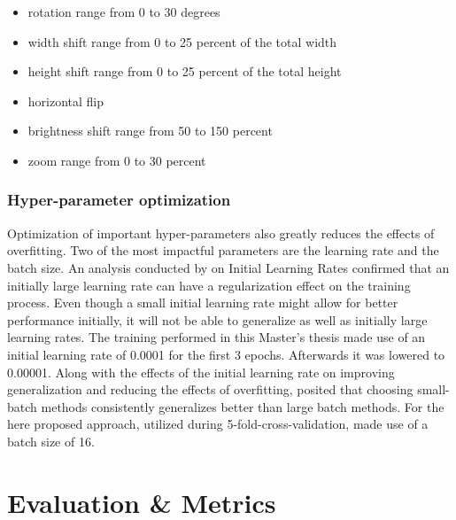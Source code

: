 \begin{itemize}
    \item rotation range from 0 to 30 degrees
    \item width shift range from 0 to 25 percent of the total width
    \item height shift range from 0 to 25 percent of the total height
    \item horizontal flip
    \item brightness shift range from 50 to 150 percent
    \item zoom range from 0 to 30 percent
\end{itemize}


\subsubsection{Hyper-parameter optimization}
Optimization of important hyper-parameters also greatly reduces the effects of overfitting. Two of the most impactful parameters are the learning rate and the batch size.
\newline\newline
An analysis conducted by \citet{Yuanzhi:2019:RegularizationInitialLargeLearningRate} on Initial Learning Rates confirmed that an initially large learning rate can have a regularization effect on the training process. Even though a small initial learning rate might allow for better performance initially, it will not be able to generalize as well as initially large learning rates. The training performed in this Master's thesis made use of an initial learning rate of 0.0001 for the first 3 epochs. Afterwards it was lowered to 0.00001.
\newline\newline
Along with the effects of the initial learning rate on improving generalization and reducing the effects of overfitting, \citet{Keskar:2016:LargeBatchTrainingGeneralization} posited that choosing small-batch methods consistently generalizes better than large batch methods. For the here proposed approach, utilized during 5-fold-cross-validation, made use of a batch size of 16.



\section{Evaluation \& Metrics}
